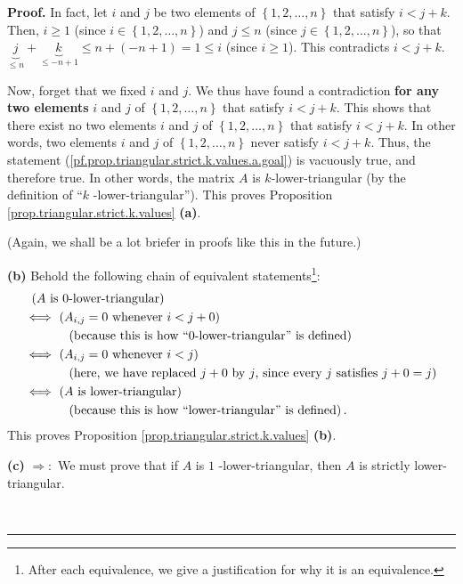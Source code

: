 \documentclass[numbers=enddot,12pt,final,onecolumn,notitlepage]{scrartcl}%
\theoremstyle{definition}
\newenvironment{proof}[1][Proof]{\noindent\textbf{#1.} }{\ \rule{0.5em}{0.5em}}
\begin{document}
\begin{proof}
In fact, let $i$ and $j$ be two elements of $\left\{  1,2,\ldots,n\right\}  $
that satisfy $i<j+k$. Then, $i\geq1$ (since $i\in\left\{  1,2,\ldots
,n\right\}  $) and $j\leq n$ (since $j\in\left\{  1,2,\ldots,n\right\}  $), so
that $\underbrace{j}_{\leq n}+\underbrace{k}_{\leq-n+1}\leq n+\left(
-n+1\right)  =1\leq i$ (since $i\geq1$). This contradicts $i<j+k$.

Now, forget that we fixed $i$ and $j$. We thus have found a contradiction
\textbf{for any two elements }$i$ and $j$ of $\left\{  1,2,\ldots,n\right\}  $
that satisfy $i<j+k$. This shows that there exist no two elements $i$ and $j$
of $\left\{  1,2,\ldots,n\right\}  $ that satisfy $i<j+k$. In other words, two
elements $i$ and $j$ of $\left\{  1,2,\ldots,n\right\}  $ never satisfy
$i<j+k$. Thus, the statement (\ref{pf.prop.triangular.strict.k.values.a.goal})
is vacuously true, and therefore true. In other words, the matrix $A$ is
$k$-lower-triangular (by the definition of \textquotedblleft$k$%
-lower-triangular\textquotedblright). This proves Proposition
\ref{prop.triangular.strict.k.values} \textbf{(a)}.

(Again, we shall be a lot briefer in proofs like this in the future.)

\textbf{(b)} Behold the following chain of equivalent
statements\footnote{After each equivalence, we give a justification for why it
is an equivalence.}:%
\begin{align*}
&  \ \left(  A\text{ is }0\text{-lower-triangular}\right) \\
&  \Longleftrightarrow\ \left(  A_{i,j}=0\text{ whenever }i<j+0\right) \\
&  \ \ \ \ \ \ \ \ \ \ \left(  \text{because this is how \textquotedblleft%
}0\text{-lower-triangular\textquotedblright\ is defined}\right) \\
&  \Longleftrightarrow\ \left(  A_{i,j}=0\text{ whenever }i<j\right) \\
&  \ \ \ \ \ \ \ \ \ \ \left(  \text{here, we have replaced }j+0\text{ by
}j\text{, since every }j\text{ satisfies }j+0=j\right) \\
&  \Longleftrightarrow\ \left(  A\text{ is lower-triangular}\right) \\
&  \ \ \ \ \ \ \ \ \ \ \left(  \text{because this is how \textquotedblleft
lower-triangular\textquotedblright\ is defined}\right)  .
\end{align*}
This proves Proposition \ref{prop.triangular.strict.k.values} \textbf{(b)}.

\textbf{(c)} $\Longrightarrow:$ We must prove that if $A$ is $1$%
-lower-triangular, then $A$ is strictly lower-triangular.


\end{proof}
\end{document}
